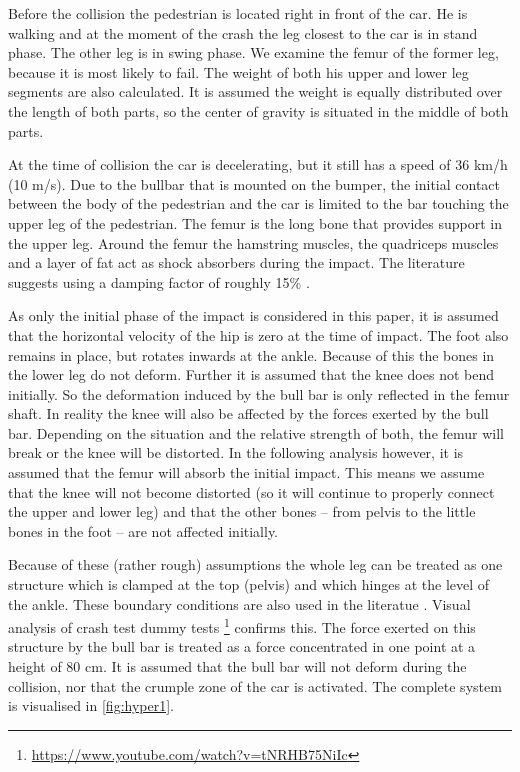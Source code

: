 Before the collision the pedestrian is located right in front of the car.
He is walking and at the moment of the crash the leg closest to the car is in
stand phase. The other leg is in swing phase. We examine the femur of the former
leg, because it is most likely to fail. The weight of both his upper and lower
leg segments are also calculated. It is assumed the weight is equally
distributed over the length of both parts, so the center of gravity is situated
in the middle of both parts.

At the time of collision the car is decelerating, but it still has a speed of 36
km/h (10 m/s). Due to the bullbar that is mounted on the bumper, the initial
contact between the body of the pedestrian and the car is limited to
the bar touching the upper leg of the pedestrian. The femur is the long
bone that provides support in the upper leg. Around the femur the hamstring
muscles, the quadriceps muscles and a layer of fat act as shock absorbers
during the impact. The literature suggests using a damping factor of roughly
15\% \cite{kannus1999comparison}.

As only the initial phase of the impact is considered in this paper, it is
assumed that the horizontal velocity of the hip is zero at the time of impact.
The foot also remains in place, but rotates inwards at the ankle.
Because of this the bones in the lower leg do not deform. Further it is assumed
that the knee does not bend initially. So the deformation induced by the bull
bar is only reflected in the femur shaft. In reality the knee will also be
affected by the forces exerted by the bull bar. Depending on the situation and
the relative strength of both, the femur will break or the knee will be
distorted. In the following analysis however, it is assumed that the femur will
absorb the initial impact. This means we assume that the knee will not become
distorted (so it will continue to properly connect the upper and lower leg) and
that the other bones -- from pelvis to the little bones in the foot -- are not
affected initially.

Because of these (rather rough) assumptions the whole leg can be treated as one
structure which is clamped at the top (pelvis) and which hinges at the level of
the ankle. These boundary conditions are also used in the literatue
\cite{snedeker2005assessing}. Visual analysis of crash test dummy tests
\footnote{\url{https://www.youtube.com/watch?v=tNRHB75NiIc}} confirms this. The
force exerted on this structure by the bull bar is treated as a force
concentrated in one point at a height of 80 cm. It is assumed that the bull bar
will not deform during the collision, nor that the crumple zone of the car is
activated. The complete system is visualised in \autoref{fig:hyper1}.

